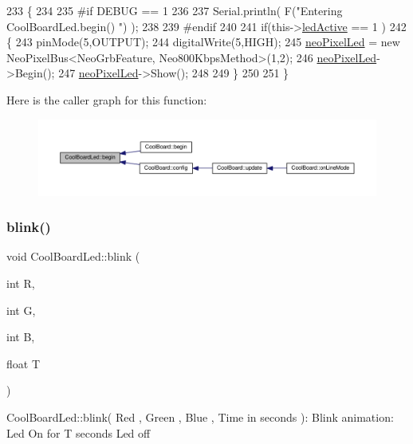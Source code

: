 \begin{DoxyCode}
233 \{
234 
235 \textcolor{preprocessor}{#if DEBUG == 1}
236 
237     Serial.println( F(\textcolor{stringliteral}{"Entering CoolBoardLed.begin() "}) );
238 
239 \textcolor{preprocessor}{#endif}
240 
241     \textcolor{keywordflow}{if}(this->\hyperlink{classCoolBoardLed_a5f17c135516fcf4b44ea8a096ba0177a}{ledActive} == 1 )
242     \{
243         pinMode(5,OUTPUT);
244         digitalWrite(5,HIGH);
245         \hyperlink{classCoolBoardLed_ac2c13fa462a010cd9242bf297c013923}{neoPixelLed} = \textcolor{keyword}{new} NeoPixelBus<NeoGrbFeature, Neo800KbpsMethod>(1,2); 
246         \hyperlink{classCoolBoardLed_ac2c13fa462a010cd9242bf297c013923}{neoPixelLed}->Begin();
247         \hyperlink{classCoolBoardLed_ac2c13fa462a010cd9242bf297c013923}{neoPixelLed}->Show();
248 
249     \}
250 
251 \} 
\end{DoxyCode}
Here is the caller graph for this function\+:
\nopagebreak
\begin{figure}[H]
\begin{center}
\leavevmode
\includegraphics[width=350pt]{classCoolBoardLed_ae3cbde8affcc6f011cbd698c8ef911f6_icgraph}
\end{center}
\end{figure}
\mbox{\label{classCoolBoardLed_a96e1ea13003eee34c9dbcef340404426}} 
\subsubsection{\texorpdfstring{blink()}{blink()}}
{\footnotesize\ttfamily void Cool\+Board\+Led\+::blink (\begin{DoxyParamCaption}\item[{int}]{R,  }\item[{int}]{G,  }\item[{int}]{B,  }\item[{float}]{T }\end{DoxyParamCaption})}

Cool\+Board\+Led\+::blink( Red , Green , Blue , Time in seconds )\+: Blink animation\+: Led On for T seconds Led off 

